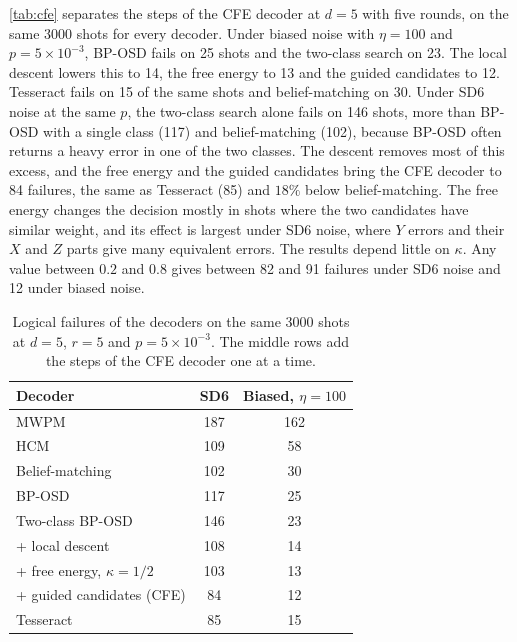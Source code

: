 \autoref{tab:cfe} separates the steps of the CFE decoder at $d=5$ with five rounds, on the same 3000 shots for every decoder. Under biased noise with $\eta=100$ and $p=5\times10^{-3}$, BP-OSD fails on 25 shots and the two-class search on 23. The local descent lowers this to 14, the free energy to 13 and the guided candidates to 12. Tesseract fails on 15 of the same shots and belief-matching on 30. Under SD6 noise at the same $p$, the two-class search alone fails on 146 shots, more than BP-OSD with a single class (117) and belief-matching (102), because BP-OSD often returns a heavy error in one of the two classes. The descent removes most of this excess, and the free energy and the guided candidates bring the CFE decoder to 84 failures, the same as Tesseract (85) and $18\%$ below belief-matching. The free energy changes the decision mostly in shots where the two candidates have similar weight, and its effect is largest under SD6 noise, where $Y$ errors and their $X$ and $Z$ parts give many equivalent errors. The results depend little on $\kappa$. Any value between $0.2$ and $0.8$ gives between 82 and 91 failures under SD6 noise and 12 under biased noise.

\begin{table}[t]
  \caption{Logical failures of the decoders on the same 3000 shots at $d=5$, $r=5$ and $p=5\times10^{-3}$. The middle rows add the steps of the CFE decoder one at a time.}
  \label{tab:cfe}
  \begin{ruledtabular}
  \begin{tabular}{lcc}
    Decoder & SD6 & Biased, $\eta=100$ \\
    \hline
    MWPM & 187 & 162 \\
    HCM & 109 & 58 \\
    Belief-matching & 102 & 30 \\
    BP-OSD & 117 & 25 \\
    Two-class BP-OSD & 146 & 23 \\
    \quad + local descent & 108 & 14 \\
    \quad + free energy, $\kappa=1/2$ & 103 & 13 \\
    \quad + guided candidates (CFE) & 84 & 12 \\
    Tesseract & 85 & 15 \\
  \end{tabular}
  \end{ruledtabular}
\end{table}

